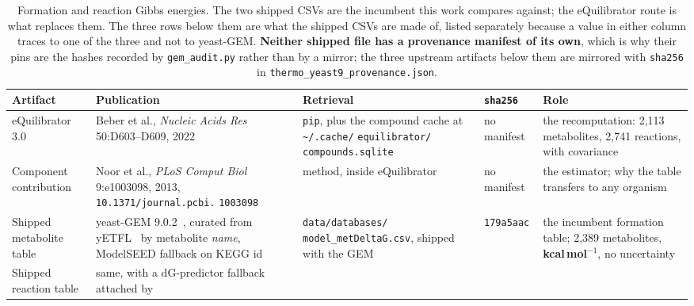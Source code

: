 \begin{table}[!htbp]
  \centering
  \footnotesize
  \caption[Gibbs energy sources]{Formation and reaction Gibbs energies. The two shipped CSVs
  are the incumbent this work compares against; the eQuilibrator route is what replaces
  them. The three rows below them are what the shipped CSVs are made of, listed separately
  because a value in either column traces to one of the three and not to yeast-GEM.
  \textbf{Neither shipped file has a provenance manifest of its own}, which is why
  their pins are the hashes recorded by \texttt{gem\_audit.py} rather than by a mirror; the
  three upstream artifacts below them are mirrored with \texttt{sha256} in
  \texttt{thermo\_yeast9\_provenance.json}.}
  \label{tab:papers-thermo}
  \begin{tabular}{@{}p{}p{}p{}p{}p{}@{}}
    \hline
    Artifact & Publication & Retrieval & \texttt{sha256} & Role \\
    \hline
    eQuilibrator 3.0~\cite{beberEQuilibrator30Database2022} & Beber et al., \emph{Nucleic
      Acids Res} 50:D603--D609, 2022 &
      \texttt{pip}, plus the compound cache at
      \texttt{\textasciitilde/.cache/} \texttt{equilibrator/} \texttt{compounds.sqlite} &
      no manifest & the recomputation: 2{,}113 metabolites, 2{,}741 reactions, with
      covariance \\
    Component contribution & Noor et al., \emph{PLoS Comput Biol} 9:e1003098, 2013,
      \texttt{10.1371/journal.pcbi.} \texttt{1003098} & method, inside eQuilibrator &
      no manifest & the estimator; why the table transfers to any organism \\
    Shipped metabolite table & yeast-GEM 9.0.2~\cite{zhangYeast9ConsensusGenomescale2024},
      curated from yETFL~\cite{oftadehGenomescaleMetabolicModel2021} by metabolite
      \emph{name}, ModelSEED fallback on KEGG id &
      \texttt{data/databases/} \texttt{model\_metDeltaG.csv}, shipped with the GEM &
      \texttt{179a5aac} &
      the incumbent formation table; 2{,}389 metabolites, \textbf{kcal\,mol$^{-1}$}, no
      uncertainty \\
    Shipped reaction table & same, with a dG-predictor fallback attached by

\end{tabular}
\end{table}
